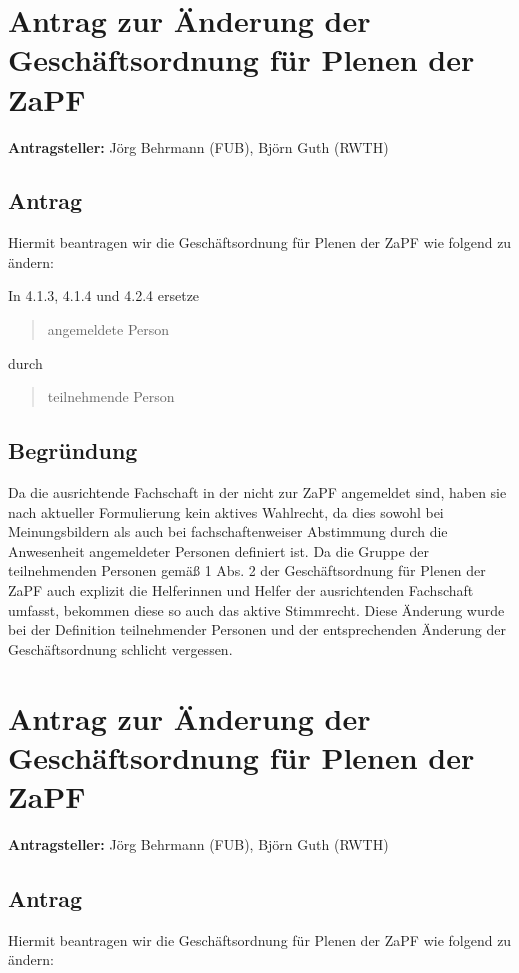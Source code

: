 \documentclass[draft,10pt,oneside]{scrartcl}
\begin{document}
\section*{Antrag zur Änderung der Geschäftsordnung für Plenen der ZaPF}

\textbf{Antragsteller:} Jörg Behrmann (FUB), Björn Guth (RWTH)

\subsection*{Antrag}

Hiermit beantragen wir die Geschäftsordnung für Plenen der ZaPF wie folgend zu
ändern:

In 4.1.3, 4.1.4 und 4.2.4 ersetze
\begin{quote}
	angemeldete Person
\end{quote}
durch
\begin{quote}
	teilnehmende Person
\end{quote}

\subsection*{Begründung}
Da die ausrichtende Fachschaft in der nicht zur ZaPF angemeldet sind, haben sie
nach aktueller Formulierung kein aktives Wahlrecht, da dies sowohl bei
Meinungsbildern als auch bei fachschaftenweiser Abstimmung durch die
Anwesenheit angemeldeter Personen definiert ist. Da die Gruppe der
teilnehmenden Personen gemäß 1 Abs. 2 der Geschäftsordnung für Plenen der ZaPF
auch explizit die Helferinnen und Helfer der ausrichtenden Fachschaft umfasst,
bekommen diese so auch das aktive Stimmrecht.
Diese Änderung wurde bei der Definition teilnehmender Personen und der
entsprechenden Änderung der Geschäftsordnung schlicht vergessen.

\newpage

\section*{Antrag zur Änderung der Geschäftsordnung für Plenen der ZaPF}

\textbf{Antragsteller:} Jörg Behrmann (FUB), Björn Guth (RWTH)

\subsection*{Antrag}

Hiermit beantragen wir die Geschäftsordnung für Plenen der ZaPF wie folgend zu
ändern:
\end{document}
